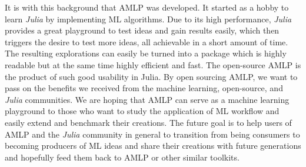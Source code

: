 \documentclass{juliacon}
\begin{document}
\vskip 6pt

It is with this background that AMLP was developed. It started as a hobby to
learn \emph{Julia} by implementing ML algorithms.
Due to its high performance, \emph{Julia} provides a great
playground to test ideas and gain results easily,
which then triggers the desire to test more ideas, all achievable in a short amount of time.
The resulting explorations can easily be turned into a package which is highly
readable but at the same time highly efficient and fast.  The open-source
AMLP is the product of such good usability in Julia. By open sourcing
AMLP, we want to pass on the benefits we received from the machine
learning, open-source, and \emph{Julia} communities. We are hoping
that AMLP can serve as a machine learning playground to those who want to
study the application of ML workflow and easily extend and benchmark their
creations. The future goal is to help users of AMLP and the \emph{Julia} community
in general to transition from being consumers to becoming producers of ML ideas
and share their creations with future generations and hopefully feed them back to AMLP
or other similar toolkits.

\vskip 6pt



\end{document}
